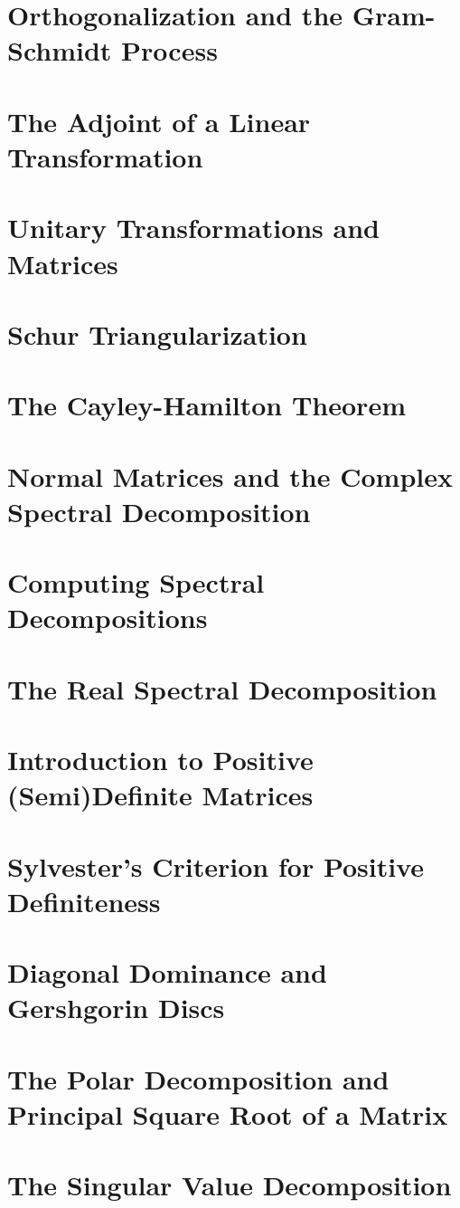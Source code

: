\documentclass{article}
\begin{document}
\section{Orthogonalization and the Gram-Schmidt Process}
\section{The Adjoint of a Linear Transformation}
\section{Unitary Transformations and Matrices}
\section{Schur Triangularization}
\section{The Cayley-Hamilton Theorem}
\section{Normal Matrices and the Complex Spectral Decomposition}
\section{Computing Spectral Decompositions}
\section{The Real Spectral Decomposition}
\section{Introduction to Positive (Semi)Definite Matrices}
\section{Sylvester's Criterion for Positive Definiteness}
\section{Diagonal Dominance and Gershgorin Discs}
\section{The Polar Decomposition and Principal Square Root of a Matrix}
\section{The Singular Value Decomposition}
\end{document}
